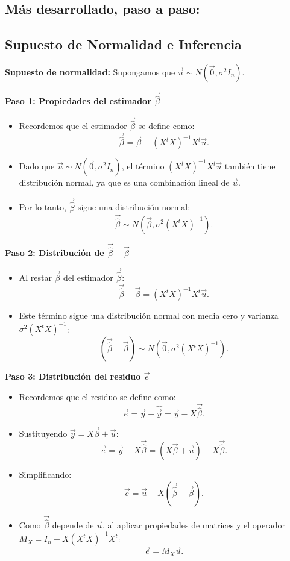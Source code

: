\documentclass[a4paper,12pt]{article}
\begin{document}
\subsection*{Más desarrollado, paso a paso:}

\subsection*{Supuesto de Normalidad e Inferencia}

\textbf{Supuesto de normalidad:} Supongamos que \( \vec{u} \sim N(\vec{0}, \sigma^2 I_n) \).

\textbf{Paso 1: Propiedades del estimador \( \vec{\hat{\beta}} \)} 
\begin{itemize}
    \item Recordemos que el estimador \( \vec{\hat{\beta}} \) se define como:
    \[
    \vec{\hat{\beta}} = \vec{\beta} + (X^t X)^{-1} X^t \vec{u}.
    \]
    \item Dado que \( \vec{u} \sim N(\vec{0}, \sigma^2 I_n) \), el término \( (X^t X)^{-1} X^t \vec{u} \) también tiene distribución normal, ya que es una combinación lineal de \( \vec{u} \).
    \item Por lo tanto, \( \vec{\hat{\beta}} \) sigue una distribución normal:
    \[
    \vec{\hat{\beta}} \sim N(\vec{\beta}, \sigma^2 (X^t X)^{-1}).
    \]
\end{itemize}

\textbf{Paso 2: Distribución de \( \vec{\hat{\beta}} - \vec{\beta} \)}
\begin{itemize}
    \item Al restar \( \vec{\beta} \) del estimador \( \vec{\hat{\beta}} \):
    \[
    \vec{\hat{\beta}} - \vec{\beta} = (X^t X)^{-1} X^t \vec{u}.
    \]
    \item Este término sigue una distribución normal con media cero y varianza \( \sigma^2 (X^t X)^{-1} \):
    \[
    (\vec{\hat{\beta}} - \vec{\beta}) \sim N(\vec{0}, \sigma^2 (X^t X)^{-1}).
    \]
\end{itemize}

\textbf{Paso 3: Distribución del residuo \( \vec{e} \)}
\begin{itemize}
    \item Recordemos que el residuo se define como:
    \[
    \vec{e} = \vec{y} - \hat{\vec{y}} = \vec{y} - X \vec{\hat{\beta}}.
    \]
    \item Sustituyendo \( \vec{y} = X \vec{\beta} + \vec{u} \):
    \[
    \vec{e} = \vec{y} - X \vec{\hat{\beta}} = (X \vec{\beta} + \vec{u}) - X \vec{\hat{\beta}}.
    \]
    \item Simplificando:
    \[
    \vec{e} = \vec{u} - X (\vec{\hat{\beta}} - \vec{\beta}).
    \]
    \item Como \( \vec{\hat{\beta}} \) depende de \( \vec{u} \), al aplicar propiedades de matrices y el operador \( M_X = I_n - X (X^t X)^{-1} X^t \):
    \[
    \vec{e} = M_X \vec{u}.
    \]
\end{itemize}
\end{document}
